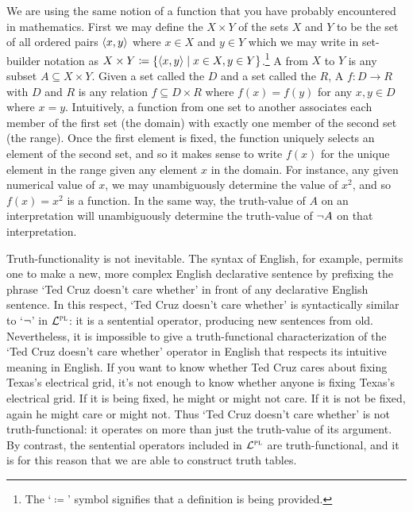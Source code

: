 We are using the same notion of a function that you have probably encountered in mathematics.
First we may define the  $X \times Y$ of the sets $X$ and $Y$ to be the set of all ordered pairs $\langle x, y\rangle$ where $x \in X$ and $y \in Y$ which we may write in set-builder notation as $X \times Y \coloneq \lbrace\langle x, y\rangle \mid x \in X, y \in Y\rbrace$.\footnote{The `$\coloneq$' symbol signifies that a definition is being provided.}
A  from $X$ to $Y$ is any subset $A \subseteq X \times Y$.
Given a set called the  $D$ and a set called the $R$, 
A  $f: D \to R$ with  $D$ and  $R$ is any relation $f \subseteq D \times R$ where $f(x) = f(y)$ for any $x, y \in D$ where $x = y$. 
Intuitively, a function from one set to another associates each member of the first set (the domain) with exactly one member of the second set (the range).
Once the first element is fixed, the function uniquely selects an element of the second set, and so it makes sense to write $f(x)$ for the unique element in the range given any element $x$ in the domain.
For instance, any given numerical value of $x$, we may unambiguously determine the value of $x^{2}$, and so $f(x)=x^{2}$ is a function.
In the same way, the truth-value of $A$ on an interpretation will unambiguously determine the truth-value of $\neg A$ on that interpretation.

Truth-functionality is not inevitable.
The syntax of English, for example, permits one to make a new, more complex English declarative sentence by prefixing the phrase `Ted Cruz doesn't care whether' in front of any declarative English sentence.
In this respect, `Ted Cruz doesn't care whether' is syntactically similar to `$\neg$' in $\mathcal{L}^{\textsc{pl}}$: it is a sentential operator, producing new sentences from old. 
Nevertheless, it is impossible to give a truth-functional characterization of the `Ted Cruz doesn't care whether' operator in English that respects its intuitive meaning in English.
If you want to know whether Ted Cruz cares about fixing Texas's electrical grid, it's not enough to know whether anyone is fixing Texas's electrical grid.
If it is being fixed, he might or might not care.
If it is not be fixed, again he might care or might not. 
Thus `Ted Cruz doesn't care whether' is not truth-functional: it operates on more than just the truth-value of its argument. %
By contrast, the sentential operators included in $\mathcal{L}^{\textsc{pl}}$ are truth-functional, and it is for this reason that we are able to construct truth tables.



